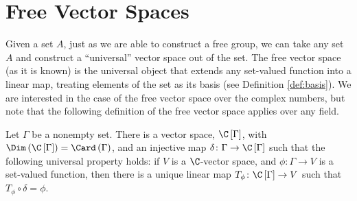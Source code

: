 \section{Free Vector Spaces}%
Given a set $A$, just as we are able to construct a free group, we can take any set $A$ and construct a ``universal'' vector space out of the set. The free vector space (as it is known) is the universal object that extends any set-valued function into a linear map, treating elements of the set as its basis (see Definition \ref{def:basis}). We are interested in the case of the free vector space over the complex numbers, but note that the following definition of the free vector space applies over any field. 
\begin{theorem}
  Let $\Gamma$ be a nonempty set. There is a vector space, $\C\left[\Gamma\right]$, with $\Dim\left(\C\left[\Gamma\right]\right) = \Card\left(\Gamma\right)$, and an injective map $\delta\colon \Gamma\rightarrow \C\left[\Gamma\right]$ such that the following universal property holds: if $V$ is a $\C$-vector space, and $\phi\colon \Gamma\rightarrow V$ is a set-valued function, then there is a unique linear map $T_{\phi}\colon \C\left[\Gamma\right]\rightarrow V$ such that $T_{\phi}\circ \delta = \phi$.
  \begin{center}
  \end{center}
\end{theorem}
